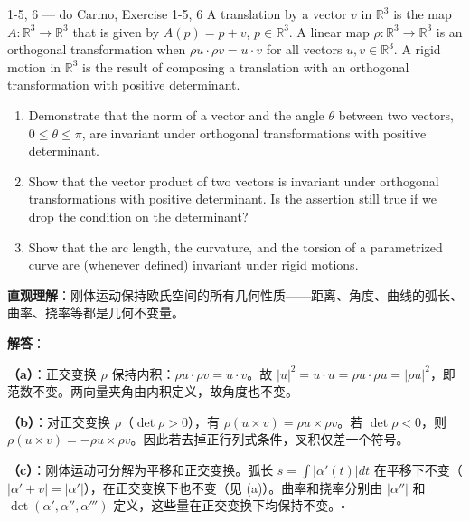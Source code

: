 \begin{exercise}{1-5, 6 — do Carmo, Exercise 1-5, 6}
A translation by a vector $v$ in $\mathbb{R}^3$ is the map $A: \mathbb{R}^3 \to \mathbb{R}^3$ that is given by $A(p) = p + v$, $p \in \mathbb{R}^3$. A linear map $\rho: \mathbb{R}^3 \to \mathbb{R}^3$ is an orthogonal transformation when $\rho u \cdot \rho v = u \cdot v$ for all vectors $u, v \in \mathbb{R}^3$. A rigid motion in $\mathbb{R}^3$ is the result of composing a translation with an orthogonal transformation with positive determinant.
\begin{enumerate}
\item[a.] Demonstrate that the norm of a vector and the angle $\theta$ between two vectors, $0 \leq \theta \leq \pi$, are invariant under orthogonal transformations with positive determinant.
\item[b.] Show that the vector product of two vectors is invariant under orthogonal transformations with positive determinant. Is the assertion still true if we drop the condition on the determinant?
\item[c.] Show that the arc length, the curvature, and the torsion of a parametrized curve are (whenever defined) invariant under rigid motions.
\end{enumerate}
\end{exercise}

\begin{solution}
\textbf{直观理解}：刚体运动保持欧氏空间的所有几何性质——距离、角度、曲线的弧长、曲率、挠率等都是几何不变量。

\textbf{解答}：

\textbf{（a）}：正交变换 $\rho$ 保持内积：$\rho u\cdot\rho v = u\cdot v$。故 $|u|^2 = u\cdot u = \rho u\cdot\rho u = |\rho u|^2$，即范数不变。两向量夹角由内积定义，故角度也不变。

\textbf{（b）}：对正交变换 $\rho$（$\det\rho > 0$），有 $\rho(u\times v) = \rho u \times \rho v$。若 $\det\rho < 0$，则 $\rho(u\times v) = -\rho u \times \rho v$。因此若去掉正行列式条件，叉积仅差一个符号。

\textbf{（c）}：刚体运动可分解为平移和正交变换。弧长 $s = \int|\alpha'(t)|dt$ 在平移下不变（$|\alpha'+v| = |\alpha'|$），在正交变换下也不变（见 (a)）。曲率和挠率分别由 $|\alpha''|$ 和 $\det(\alpha',\alpha'',\alpha''')$ 定义，这些量在正交变换下均保持不变。$\square$
\end{solution}

